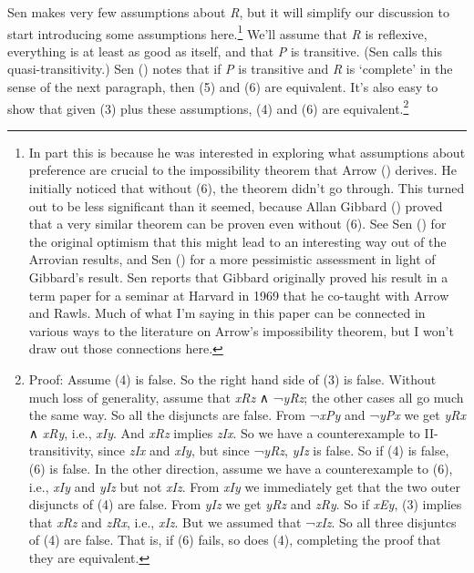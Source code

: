 \documentclass[
  11pt,
  letterpaper,
  DIV=11,
  numbers=noendperiod,
  twoside]{scrartcl}
\begin{document}
Sen makes very few assumptions about \emph{R}, but it will simplify our
discussion to start introducing some assumptions here.\footnote{In part
  this is because he was interested in exploring what assumptions about
  preference are crucial to the impossibility theorem that Arrow
  () derives. He initially noticed that
  without (6), the theorem didn't go through. This turned out to be less
  significant than it seemed, because Allan Gibbard
  () proved that a very similar theorem
  can be proven even without (6). See Sen ()
  for the original optimism that this might lead to an interesting way
  out of the Arrovian results, and Sen
  () for a more pessimistic
  assessment in light of Gibbard's result. Sen reports that Gibbard
  originally proved his result in a term paper for a seminar at Harvard
  in 1969 that he co-taught with Arrow and Rawls. Much of what I'm
  saying in this paper can be connected in various ways to the
  literature on Arrow's impossibility theorem, but I won't draw out
  those connections here.} We'll assume that \emph{R} is reflexive,
everything is at least as good as itself, and that \emph{P} is
transitive. (Sen calls this quasi-transitivity.) Sen
() notes that if \emph{P}
is transitive and \emph{R} is `complete' in the sense of the next
paragraph, then (5) and (6) are equivalent. It's also easy to show that
given (3) plus these assumptions, (4) and (6) are equivalent.\footnote{Proof:
  Assume (4) is false. So the right hand side of (3) is false. Without
  much loss of generality, assume that \emph{xRz} ∧ ¬\emph{yRz}; the
  other cases all go much the same way. So all the disjuncts are false.
  From ¬\emph{xPy} and ¬\emph{yPx} we get \emph{yRx} ∧ \emph{xRy}, i.e.,
  \emph{xIy}. And \emph{xRz} implies \emph{zIx}. So we have a
  counterexample to II-transitivity, since \emph{zIx} and \emph{xIy},
  but since ¬\emph{yRz}, \emph{yIz} is false. So if (4) is false, (6) is
  false. In the other direction, assume we have a counterexample to (6),
  i.e., \emph{xIy} and \emph{yIz} but not \emph{xIz}. From \emph{xIy} we
  immediately get that the two outer disjuncts of (4) are false. From
  \emph{yIz} we get \emph{yRz} and \emph{zRy}. So if \emph{xEy}, (3)
  implies that \emph{xRz} and \emph{zRx}, i.e., \emph{xIz}. But we
  assumed that ¬\emph{xIz}. So all three disjuntcs of (4) are false.
  That is, if (6) fails, so does (4), completing the proof that they are
  equivalent.}
\end{document}
